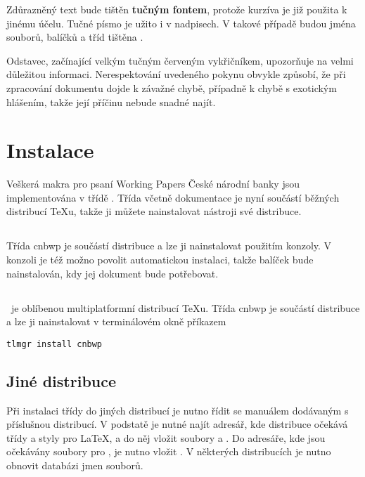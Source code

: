 \documentclass[12pt]{article}
\begin{document}
Zdůrazněný text bude tištěn \textbf{tučným fontem}, protože kurzíva je již použita k jinému účelu.
Tučné písmo je užito i v nadpisech. V takové případě budou jména souborů, balíčků a tříd tištěna
\textbf{}.

\pozor Odstavec, začínající  velkým tučným červeným vykřičníkem, upozorňuje na velmi důležitou
informaci. Nerespektování uvedeného pokynu obvykle způsobí, že při zpracování dokumentu dojde k
závažné chybě, případně k chybě s exotickým hlášením, takže její příčinu nebude snadné najít.

\section{Instalace}\label{instalace}
Veškerá makra pro psaní Working Papers České národní banky jsou implementována v třídě
. Třída včetně dokumentace je nyní součástí běžných distribucí \TeX{}u, takže ji
můžete nainstalovat nástroji své distribuce.

\subsection{\MikTeX}\label{inst.miktex}
Třída cnbwp je součástí distribuce a lze ji nainstalovat použitím konzoly. V konzoli je též možno
povolit automatickou instalaci, takže balíček bude nainstalován, kdy jej dokument bude potřebovat.

\subsection{\TeXLive}\label{inst.tl}
\TeXLive\ je oblíbenou multiplatformní distribucí \TeX{}u. Třída cnbwp je součástí distribuce a lze
ji nainstalovat v terminálovém okně příkazem

\begin{verbatim}
tlmgr install cnbwp
\end{verbatim}

\subsection{Jiné distribuce}\label{inst.other}
Při instalaci třídy  do jiných distribucí je nutno řídit se manuálem dodávaným s
příslušnou distribucí. V podstatě je nutné najít adresář, kde distribuce očekává třídy a styly pro
\LaTeX, a do něj vložit soubory  a . Do adresáře, kde jsou
očekávány soubory pro \BibTeX, je nutno vložit . V některých distribucích je nutno
obnovit databázi jmen souborů.
\end{document}
